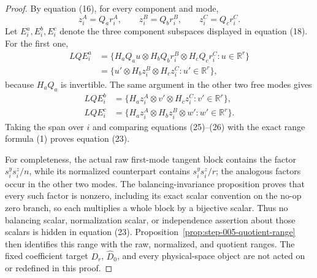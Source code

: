 \begin{proof}
By equation (16), for every component and mode,
\[
  z_i^A=Q_ar_i^A,\qquad z_i^B=Q_br_i^B,
  \qquad z_i^C=Q_cr_i^C.                                     \tag{24}
\]
Let \(E_i^a,E_i^b,E_i^c\) denote the three component subspaces displayed in
equation (18). For the first one,
\[
\begin{aligned}
  LQ E_i^a
  &=\{H_aQ_au\otimes H_bQ_br_i^B\otimes H_cQ_cr_i^C:
      u\in\mathbb R^r\}\\
  &=\{u'\otimes H_bz_i^B\otimes H_cz_i^C:
      u'\in\mathbb R^r\},
\end{aligned}\tag{25}
\]
because \(H_aQ_a\) is invertible. The same argument in the other two free
modes gives
\[
\begin{aligned}
  LQ E_i^b
    &=\{H_az_i^A\otimes v'\otimes H_cz_i^C:v'\in\mathbb R^r\},\\
  LQ E_i^c
    &=\{H_az_i^A\otimes H_bz_i^B\otimes w':w'\in\mathbb R^r\}.
\end{aligned}\tag{26}
\]
Taking the span over \(i\) and comparing equations (25)--(26) with the
exact range formula (1) proves equation (23).

For completeness, the actual raw first-mode tangent block contains the
factor \(s_i^ys_i^z/n\), while its normalized counterpart contains
\(s_i^ys_i^z/r\); the analogous factors occur in the other two modes. The
balancing-invariance proposition proves that every such factor is
nonzero, including its exact scalar convention on the no-op zero branch, so
each multiplies a whole block by a bijective scalar. Thus no balancing scalar,
normalization scalar, or independence assertion about those scalars is hidden
in equation (23). Proposition~\ref{prop:step-005-quotient-range} then
identifies this range with the raw, normalized, and quotient ranges. The fixed coefficient
target \(D_r\), \(\widehat D_0\), and every physical-space object are not acted
on or redefined in this proof. 

\end{proof}

